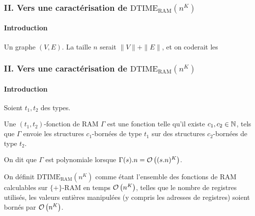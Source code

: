 \documentclass[10pt]{beamer}
\newcommand{\dtimeram}{\text{DTIME}_{\text{RAM}}\left( n^K \right)}
\begin{document}
	\begin{frame}
		\frametitle{II. Vers une caractérisation de $\dtimeram$}
		\framesubtitle{Introduction}
		\begin{example}
			Un graphe $(V,E)$. La taille $n$ serait $\|V\| + \|E\|$, et on coderait les 
		\end{example}
	\end{frame}
		
	
	
	\begin{frame}
		\frametitle{II. Vers une caractérisation de $\dtimeram$}
		\framesubtitle{Introduction}
		
		\begin{definition}
			\label{def:fonction_de_RAM}
			Soient $t_1, t_2$ des types. 
			
			Une $(t_1, t_2)$-fonction de RAM $\Gamma$ est une fonction telle qu'il existe $c_1, c_2 \in \mathbb{N}$, tels que $\Gamma$ envoie les structures $c_1$-bornées de type $t_1$ sur des structures $c_2$-bornées de type $t_2$.
			
			On dit que $\Gamma$ est polynomiale lorsque $\Gamma(s).n = \mathcal{O}\left( (s.n)^K \right)$.
			
		\end{definition}
		
		\pause 
		
		\begin{definition}
			\label{def:temps_poly_RAM}
			On définit $\dtimeram$ comme étant l'ensemble des fonctions de RAM calculables sur $\{+\}$-RAM en temps $\mathcal{O}\left( n^K \right)$, telles que le nombre de registres utilisés, les valeurs entières manipulées (y compris les adresses de registres) soient bornés par $\mathcal{O}\left( n^K \right)$.
		\end{definition}
	\end{frame}
	
	
	
\end{document}
